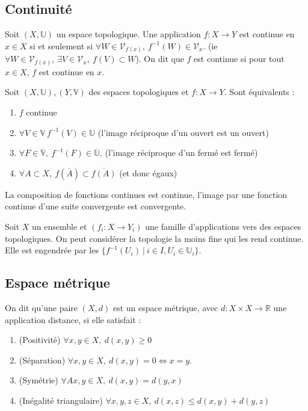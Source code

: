 \subsection{ Continuité}
\begin{definition}
        Soit $(X,\mathbb{U})$ un espace topologique. Une application $f:X\to Y$ est continue en $x\in X$ si et seulement si $\forall W\in \mathcal{V}_{f(x)}, \ f^{-1}(W)\in \mathcal{V}_x$. (ie $\forall W\in \mathcal{V}_{f(x)},\ \exists V\in \mathcal{V}_x,\ f(V)\subset W$). On dit que $f$ est continue si pour tout $x\in X$, $f$ est continue en $x$. \\

\end{definition}
\begin{proposition}

    Soit $(X,\mathbb{U}), (Y,\mathbb{V})$ des espaces topologiques et $f:X\to Y$. Sont équivalents :
    \begin{enumerate}
        \item $f$ continue
        \item $\forall V\in \mathbb{V}\ f^{-1}(V)\in \mathbb{U}$ (l'image réciproque d'un ouvert est un ouvert)
        \item $\forall F \in \overline{\mathbb{V}},\ f^{-1}(F) \in \overline{\mathbb{U}}$. (l'image réciproque d'un fermé est fermé)
        \item $\forall A\subset X,\ f(\overline{A})\subset \overline{f(A)}$ (et donc égaux)
    \end{enumerate}
\end{proposition}

La composition de fonctions continues est continue, l'image par une fonction continue d'une suite convergente est convergente.
\begin{ex}
         Soit $X$ un ensemble et $(f_i:X\to Y_i)$ une famille d'applications vers des espaces topologiques. On peut considérer la topologie la moins fine qui les rend continue. Elle est engendrée par les $\{f^{-1}(U_i)\ |\ i\in I, U_i\in \mathbb{U}_i\}$.
\end{ex}

\subsection{Espace métrique}
\begin{definition}
    On dit qu'une paire $(X,d)$ est un espace métrique, avec $d:X\times X\to \mathbb{R} $ une application distance, si elle satisfait :
    \begin{enumerate}
        \item (Positivité) $\forall x,y \in X,\ d(x,y) \geq 0$
        \item(Séparation) $\forall x,y\in X, ~ d(x,y)=0\Leftrightarrow x=y$.
        \item (Symétrie) $\forall Ax,y\in X,\ d(x,y)=d(y,x)$
        \item (Inégalité triangulaire) $\forall x,y,z\in X,\ d(x,z)\le d(x,y)+d(y,z)$
    \end{enumerate}
\end{definition}

